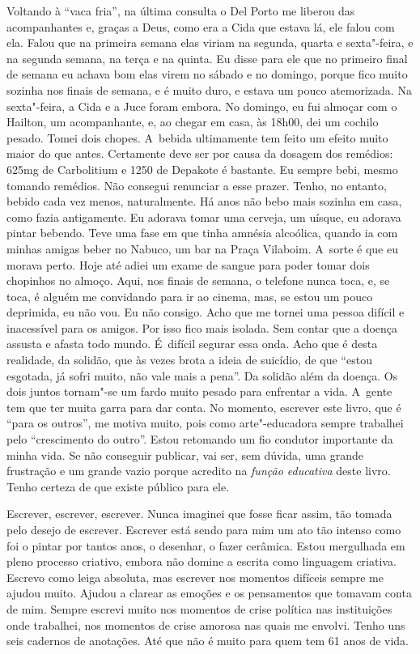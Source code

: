 Voltando à ``vaca fria'', na última consulta o Del Porto me liberou das
acompanhantes e, graças a Deus, como era a Cida que estava lá, ele falou
com ela. Falou que na primeira semana elas viriam na segunda, quarta e
sexta"-feira, e na segunda semana, na terça e na quinta. Eu disse para
ele que no primeiro final de semana eu achava bom elas virem no sábado e
no domingo, porque fico muito sozinha nos finais de semana, e é muito
duro, e estava um pouco atemorizada. Na sexta"-feira, a Cida e a Juce
foram embora. No domingo, eu fui almoçar com o Hailton, um acompanhante,
e, ao chegar em casa, às 18h00, dei um cochilo pesado. Tomei dois
chopes. A~bebida ultimamente tem feito um efeito muito maior do que
antes. Certamente deve ser por causa da dosagem dos remédios: 625mg de
Carbolitium e 1250 de Depakote é bastante. Eu sempre bebi, mesmo tomando
remédios. Não consegui renunciar a esse prazer. Tenho, no entanto,
bebido cada vez menos, naturalmente. Há anos não bebo mais sozinha em
casa, como fazia antigamente. Eu adorava tomar uma cerveja, um uísque,
eu adorava pintar bebendo. Teve uma fase em que tinha amnésia alcoólica,
quando ia com minhas amigas beber no Nabuco, um bar na Praça Vilaboim. A~sorte é que eu morava perto. Hoje até adiei um exame de sangue para
poder tomar dois chopinhos no almoço. Aqui, nos finais de semana, o
telefone nunca toca, e, se toca, é alguém me convidando para ir ao
cinema, mas, se estou um pouco deprimida, eu não vou. Eu não consigo.
Acho que me tornei uma pessoa difícil e inacessível para os amigos. Por
isso fico mais isolada. Sem contar que a doença assusta e afasta todo
mundo. É~difícil segurar essa onda. Acho que é desta realidade, da
solidão, que às vezes brota a ideia de suicídio, de que ``estou
esgotada, já sofri muito, não vale mais a pena''. Da solidão além da
doença. Os dois juntos tornam"-se um fardo muito pesado para enfrentar a
vida. A~gente tem que ter muita garra para dar conta. No momento,
escrever este livro, que é ``para os outros'', me motiva muito, pois
como arte"-educadora sempre trabalhei pelo ``crescimento do outro''.
Estou retomando um fio condutor importante da minha vida. Se não
conseguir publicar, vai ser, sem dúvida, uma grande frustração e um
grande vazio porque acredito na \emph{função educativa}\textbf{} deste
livro. Tenho certeza de que existe público para ele.

Escrever, escrever, escrever. Nunca imaginei que fosse ficar assim, tão
tomada pelo desejo de escrever. Escrever está sendo para mim um ato tão
intenso como foi o pintar por tantos anos, o desenhar, o fazer cerâmica.
Estou mergulhada em pleno processo criativo, embora não domine a escrita
como linguagem criativa. Escrevo como leiga absoluta, mas escrever nos
momentos difíceis sempre me ajudou muito. Ajudou a clarear as emoções e
os pensamentos que tomavam conta de mim. Sempre escrevi muito nos momentos
de crise política nas instituições onde trabalhei, nos momentos de crise 
amorosa nas quais me envolvi. Tenho uns seis cadernos de anotações.
Até que não é muito para quem tem 61 anos de vida.

